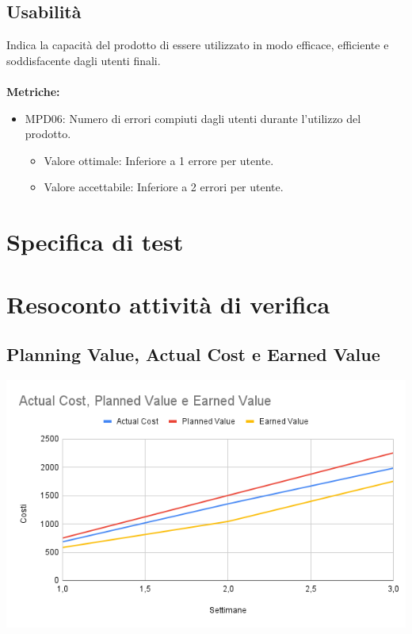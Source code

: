 \documentclass[12pt]{article}
\begin{document}
\subsection{Usabilità}
	Indica la capacità del prodotto di essere utilizzato in modo efficace, efficiente e soddisfacente dagli utenti finali.
	\\\\
	\textbf{Metriche:}
		  \begin{itemize}
			\item MPD06: Numero di errori compiuti dagli utenti durante l'utilizzo del prodotto.
			\begin{itemize}	
				\item Valore ottimale: Inferiore a 1 errore per utente.
				\item Valore accettabile: Inferiore a 2 errori per utente.
			\end{itemize}
		\end{itemize}
		  


\section{Specifica di test}
\section {Resoconto attività di verifica}
\subsection{Planning Value, Actual Cost e Earned Value}
\begin{center}
	\includegraphics[scale=0.5]{AC_PV_EV.png}
\end{center}
\end{document}
